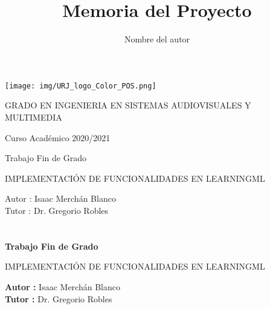 \documentclass[a4paper, 12pt]{book}
\title{Memoria del Proyecto}
\author{Nombre del autor}
\begin{document}
\renewcommand{\refname}{Bibliografía}  %
\renewcommand{\appendixname}{Apéndice}


\begin{titlepage}
\begin{center}
\texttt{[image: img/URJ\_logo\_Color\_POS.png]}

\vspace{1.75cm}

\Large
GRADO EN INGENIERIA EN SISTEMAS AUDIOVISUALES Y MULTIMEDIA

\vspace{0.4cm}

\large
Curso Académico 2020/2021

\vspace{0.8cm}

Trabajo Fin de Grado

\vspace{2.5cm}

\LARGE
IMPLEMENTACIÓN DE FUNCIONALIDADES EN LEARNINGML

\vspace{4cm}

\large
Autor : Isaac Merchán Blanco\\
Tutor : Dr. Gregorio Robles
\end{center}
\end{titlepage}

\newpage
\mbox{}
\thispagestyle{empty} %


\clearpage
{}
\chapter*{}

\vspace{-4cm}
\begin{center}
\LARGE
\textbf{Trabajo Fin de Grado}

\vspace{1cm}
\large
IMPLEMENTACIÓN DE FUNCIONALIDADES EN LEARNINGML

\vspace{1cm}
\large
\textbf{Autor :} Isaac Merchán Blanco \\
\textbf{Tutor :} Dr. Gregorio Robles

\end{center}
\end{document}
